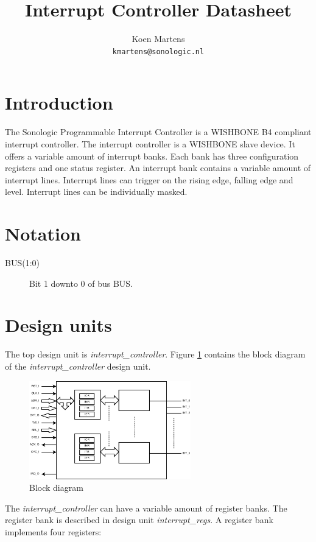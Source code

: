 \documentclass[a4paper,twocolumn,12pt]{article}
\title{Interrupt Controller Datasheet}
\author{Koen Martens\\
        \texttt{kmartens@sonologic.nl}}
\begin{document}
\maketitle

\section{Introduction}

The Sonologic Programmable Interrupt Controller is a WISHBONE B4 \cite{wishbone} compliant interrupt controller. The interrupt controller is a WISHBONE slave device. It offers a variable amount of interrupt banks. Each bank has three configuration registers and one status register. An interrupt bank contains a variable amount of interrupt lines. Interrupt lines can trigger on the rising edge, falling edge and level. Interrupt lines can be individually masked.


\section{Notation}

\begin{description}
    \item[BUS(1:0)] Bit 1 downto 0 of bus BUS.
\end{description}

\section{Design units}

The top design unit is \emph{interrupt\_controller}. Figure \ref{fig:block_diagram} contains the block diagram of the \emph{interrupt\_controller} design unit.

\begin{figure}[h]
    \centering
    \includegraphics[width=7cm]{pic_block_diagram}
    \caption{Block diagram}
    \label{fig:block_diagram}
\end{figure}

The \emph{interrupt\_controller} can have a variable amount of register banks. The register bank is described in design unit \emph{interrupt\_regs}. A register bank implements four registers:
\end{document}
